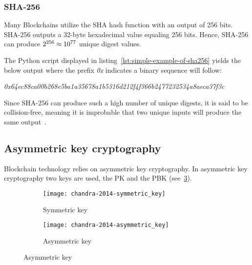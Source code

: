 \subsubsection{SHA-256}
Many \glspl{Blockchain} utilize the \gls{SHA} hash function with an output of 256 bits.
SHA-256 outputs a 32-byte hexadecimal value equaling 256 bits.
Hence, SHA-256 can produce \begin{math}2\textsuperscript{256}\approx10\textsuperscript{77}\end{math} unique digest values.


The Python script displayed in listing~\ref{lst:simple-example-of-sha256} yields the below output where the prefix \emph{0x} indicates a binary sequence will follow:

\smallskip
\begingroup\small\emph{0x64ec88ca00b268e5ba1a35678a1b5316d212f4f366b2477232534a8aeca37f3c}\endgroup
\smallskip

Since SHA-256 can produce such a high number of unique digests, it is said to be collision-free, meaning it is improbable that two unique inputs will produce the same output~\autocite[8]{yaga_blockchain_2018}.

\subsection{Asymmetric key cryptography}\label{subsec:asymmetric-key-cryptography}

\Gls{Blockchain} technology relies on asymmetric key cryptography.
In asymmetric key cryptography two keys are used, the \gls{PK} and the \gls{PBK} (see~\cref{fig:asymmetric-key}).

\begin{figure}[H]
    \caption[Cryptographic keys]{Cryptographic keys~\autocite[84]{chandra_comparative_2014}}\label{fig:cryptographic-keys}
    \begin{subfigure}[b]{\textwidth}
        \centering
        \texttt{[image: chandra-2014-symmetric\_key]}
        \caption{Symmetric key}
        \label{fig:symmetric-key}
    \end{subfigure}
    \begin{subfigure}[b]{\textwidth}
        \centering
        \texttt{[image: chandra-2014-asymmetric\_key]}
        \caption{Asymmetric key}
        \label{fig:asymmetric-key}
    \end{subfigure}
\end{figure}

